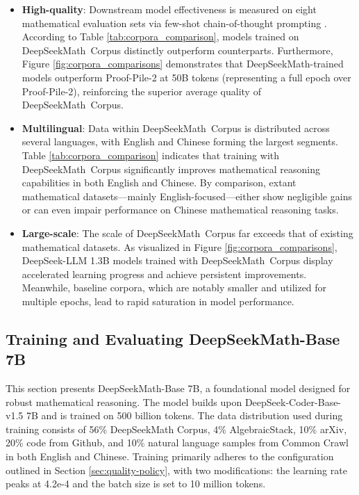 \begin{itemize}[topsep=0pt]
    \item \textbf{High-quality}:
    Downstream model effectiveness is measured on eight mathematical evaluation sets via few-shot chain-of-thought prompting \cite{cot}. According to Table \ref{tab:corpora_comparison}, models trained on DeepSeekMath~Corpus distinctly outperform counterparts. Furthermore, Figure \ref{fig:corpora_comparisons} demonstrates that DeepSeekMath-trained models outperform Proof-Pile-2 at 50B tokens (representing a full epoch over Proof-Pile-2), reinforcing the superior average quality of DeepSeekMath~Corpus. 
    \item \textbf{Multilingual}:
    Data within DeepSeekMath~Corpus is distributed across several languages, with English and Chinese forming the largest segments. Table \ref{tab:corpora_comparison} indicates that training with DeepSeekMath~Corpus significantly improves mathematical reasoning capabilities in both English and Chinese. By comparison, extant mathematical datasets—mainly English-focused—either show negligible gains or can even impair performance on Chinese mathematical reasoning tasks.
    \item \textbf{Large-scale}:
    The scale of DeepSeekMath~Corpus far exceeds that of existing mathematical datasets. As visualized in Figure \ref{fig:corpora_comparisons}, DeepSeek-LLM 1.3B models trained with DeepSeekMath~Corpus display accelerated learning progress and achieve persistent improvements. Meanwhile, baseline corpora, which are notably smaller and utilized for multiple epochs, lead to rapid saturation in model performance.
\end{itemize}

\subsection{Training and Evaluating DeepSeekMath-Base 7B}

This section presents DeepSeekMath-Base 7B, a foundational model designed for robust mathematical reasoning. The model builds upon DeepSeek-Coder-Base-v1.5 7B \citep{deepseek-coder} and is trained on 500 billion tokens. The data distribution used during training consists of 56\% DeepSeekMath Corpus, 4\% AlgebraicStack, 10\% arXiv, 20\% code from Github, and 10\% natural language samples from Common Crawl in both English and Chinese. Training primarily adheres to the configuration outlined in Section \ref{sec:quality-policy}, with two modifications: the learning rate peaks at 4.2e-4 and the batch size is set to 10 million tokens.

